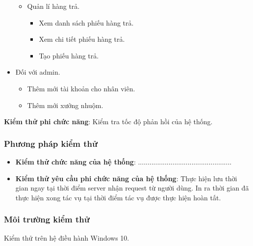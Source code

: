 \begin{itemize}
\begin{itemize}
        \item Quản lí hàng trả.
        \begin{itemize}
            \item Xem danh sách phiếu hàng trả.
            \item Xem chi tiết phiếu hàng trả.
            \item Tạo phiếu hàng trả.
        \end{itemize}
    \end{itemize}
    \item Đối với admin.
    \begin{itemize}
        \item Thêm mới tài khoản cho nhân viên.
        \item Thêm mới xưởng nhuộm.
    \end{itemize}
\end{itemize}


\textbf{Kiểm thử phi chức năng}: Kiểm tra tốc độ phản hồi của hệ thống.

\subsubsection{Phương pháp kiểm thử}
\begin{itemize}
    \item \textbf{Kiểm thử chức năng của hệ thống}: .................................................
    \item \textbf{Kiểm thử yêu cầu phi chức năng của hệ thống}: Thực hiện lưu thời gian ngay tại thời điểm server nhận request từ người dùng. In ra thời gian đã thực hiện xong tác vụ tại thời điểm tác vụ được thực hiện hoàn tất.
\end{itemize}

\subsubsection{Môi trường kiểm thử}
Kiểm thử trên hệ điều hành Windows 10.